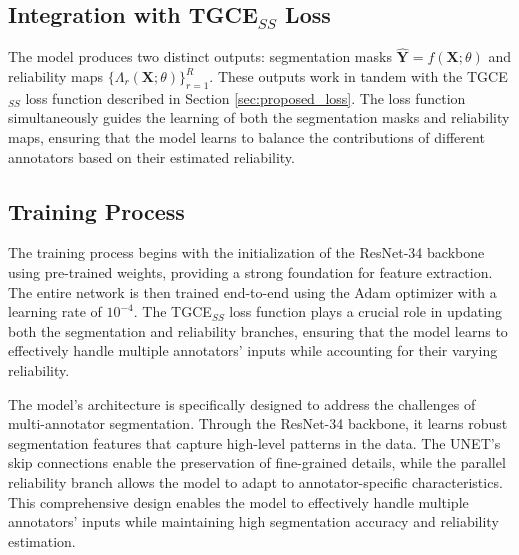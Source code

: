 \subsection{Integration with TGCE$_{SS}$ Loss}

The model produces two distinct outputs: segmentation masks
$\mathbf{\hat{Y}} = f(\mathbf{X};\theta)$ and reliability maps
$\{\Lambda_r(\mathbf{X};\theta)\}_{r=1}^R$. These outputs work in
tandem with the TGCE$_{SS}$ loss function described in Section
\ref{sec:proposed_loss}. The loss function simultaneously guides the
learning of both the segmentation masks and reliability maps,
ensuring that the model learns to balance the contributions of
different annotators based on their estimated reliability.

\subsection{Training Process}

The training process begins with the initialization of the ResNet-34
backbone using pre-trained weights, providing a strong foundation for
feature extraction. The entire network is then trained end-to-end
using the Adam optimizer with a learning rate of $10^{-4}$. The
TGCE$_{SS}$ loss function plays a crucial role in updating both the
segmentation and reliability branches, ensuring that the model learns
to effectively handle multiple annotators' inputs while accounting
for their varying reliability.

The model's architecture is specifically designed to address the
challenges of multi-annotator segmentation. Through the ResNet-34
backbone, it learns robust segmentation features that capture
high-level patterns in the data. The UNET's skip connections enable
the preservation of fine-grained details, while the parallel
reliability branch allows the model to adapt to annotator-specific
characteristics. This comprehensive design enables the model to
effectively handle multiple annotators' inputs while maintaining high
segmentation accuracy and reliability estimation.
